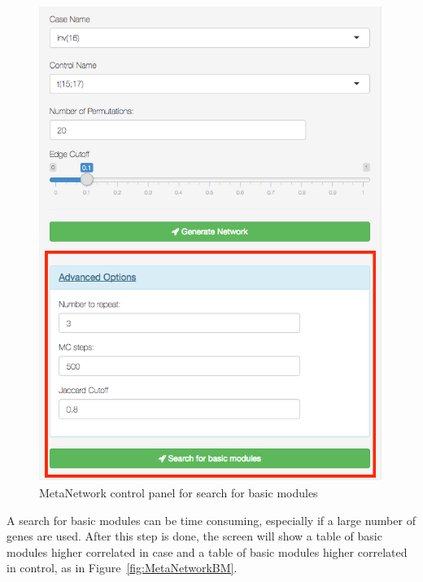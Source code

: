 \begin{steps}
\begin{figure}[H]
\begin{center}
\includegraphics[scale=0.35]{./figure/MetaNetwork/MetaNetworkstep2}
\caption{MetaNetwork control panel for search for basic modules}
\label{fig:MetaNetworkstep2}
\end{center}
\end{figure}

A search for basic modules can be time consuming, 
especially if a large number of genes are used. 
After this step is done, the screen will show a table of basic modules higher correlated in case and a table of basic modules higher correlated in control, as in Figure~\ref{fig:MetaNetworkBM}. 


\end{steps}
